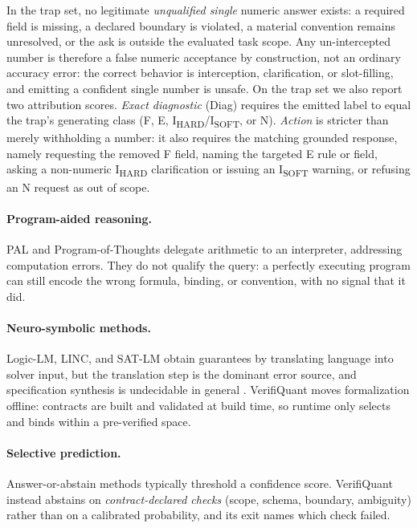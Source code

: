 \documentclass[sigconf,anonymous]{acmart}
\begin{document}
In the trap set, no legitimate \emph{unqualified single} numeric answer exists: a required field is missing, a declared boundary is violated, a material convention remains unresolved, or the ask is outside the evaluated task scope.
Any un-intercepted number is therefore a false numeric acceptance by construction, not an ordinary accuracy error: the correct behavior is interception, clarification, or slot-filling, and emitting a confident single number is unsafe.
On the trap set we also report two attribution scores. \emph{Exact diagnostic} (Diag) requires the emitted label to equal the trap's generating class (F, E, I\textsubscript{HARD}/I\textsubscript{SOFT}, or N). \emph{Action} is stricter than merely withholding a number: it also requires the matching grounded response, namely requesting the removed F field, naming the targeted E rule or field, asking a non-numeric I\textsubscript{HARD} clarification or issuing an I\textsubscript{SOFT} warning, or refusing an N request as out of scope.

\paragraph{Program-aided reasoning.}
PAL and Program-of-Thoughts \cite{gao2023pal,chen2023pot} delegate arithmetic to an interpreter, addressing computation errors.
They do not qualify the query: a perfectly executing program can still encode the wrong formula, binding, or convention, with no signal that it did.

\paragraph{Neuro-symbolic methods.}
Logic-LM, LINC, and SAT-LM \cite{pan2023logiclm,olausson2023linc,ye2023satlm} obtain guarantees by translating language into solver input, but the translation step is the dominant error source, and specification synthesis is undecidable in general \cite{zhou2026formaljudge}.
VerifiQuant moves formalization offline: contracts are built and validated at build time, so runtime only selects and binds within a pre-verified space.

\paragraph{Selective prediction.}
Answer-or-abstain methods \cite{elyaniv2010foundations,geifman2017selective} typically threshold a confidence score.
VerifiQuant instead abstains on \emph{contract-declared checks} (scope, schema, boundary, ambiguity) rather than on a calibrated probability, and its exit names which check failed.
\end{document}
